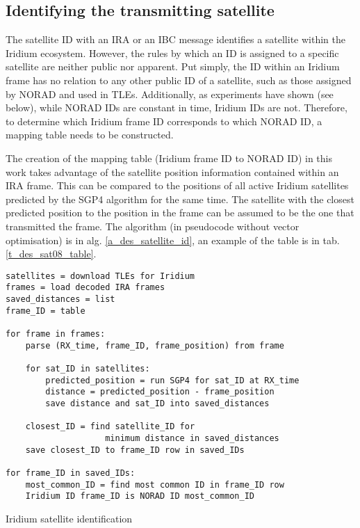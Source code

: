 \subsection{Identifying the transmitting satellite}
The satellite ID with an IRA or an IBC message identifies a satellite within the Iridium ecosystem. However, the rules by which an ID is assigned to a specific satellite are neither public nor apparent. Put simply, the ID within an Iridium frame has no relation to any other public ID of a satellite, such as those assigned by NORAD and used in TLEs. Additionally, as experiments have shown (see below), while NORAD IDs are constant in time, Iridium IDs are not. Therefore, to determine which Iridium frame ID corresponds to which NORAD ID, a mapping table needs to be constructed.

The creation of the mapping table (Iridium frame ID to NORAD ID) in this work takes advantage of the satellite position information contained within an IRA frame. This can be compared to the positions of all active Iridium satellites predicted by the SGP4 algorithm for the same time. The satellite with the closest predicted position to the position in the frame can be assumed to be the one that transmitted the frame. The algorithm (in pseudocode without vector optimisation) is in alg. \ref{a_des_satellite_id}, an example of the table is in tab. \ref{t_des_sat08_table}.

\begin{algorithm}
    \centering
    \begin{verbatim}
satellites = download TLEs for Iridium
frames = load decoded IRA frames
saved_distances = list
frame_ID = table

for frame in frames:
    parse (RX_time, frame_ID, frame_position) from frame

    for sat_ID in satellites:
        predicted_position = run SGP4 for sat_ID at RX_time
        distance = predicted_position - frame_position
        save distance and sat_ID into saved_distances

    closest_ID = find satellite_ID for 
                    minimum distance in saved_distances
    save closest_ID to frame_ID row in saved_IDs

for frame_ID in saved_IDs:
    most_common_ID = find most common ID in frame_ID row
    Iridium ID frame_ID is NORAD ID most_common_ID
    \end{verbatim}
    \caption{Iridium satellite identification}
    \label{a_des_satellite_id}
\end{algorithm}


